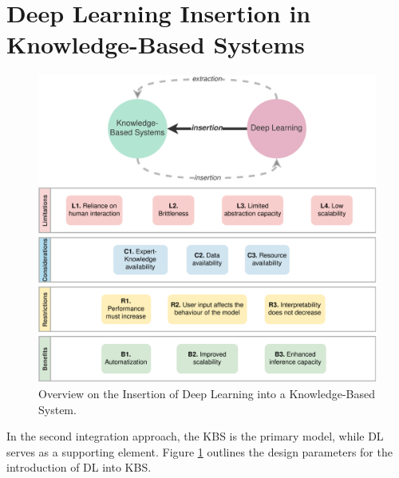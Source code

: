 \section{Deep Learning Insertion in Knowledge-Based Systems}\label{5_sec:dl_intro_kbs_methodology}
\begin{figure}[t]
    \centering
    \includegraphics[width=\linewidth]{5_dlintegrationkbs/figures/DL_intro_KBS.eps}
    \caption{Overview on the Insertion of Deep Learning into a Knowledge-Based System.}
    \label{fig:overview_dl_kbs_intro}
\end{figure}
In the second integration approach, the KBS is the primary model, while DL serves as a supporting element. Figure \ref{fig:overview_dl_kbs_intro} outlines the design parameters for the introduction of DL into KBS.
